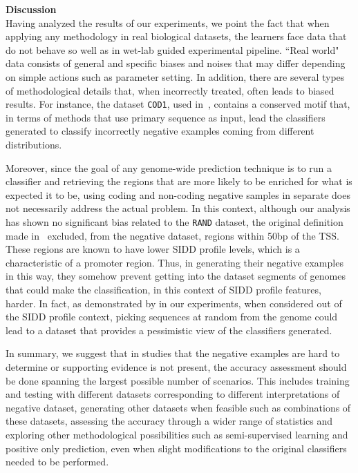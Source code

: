 \documentclass[runningheads,a4paper]{llncs}
\begin{document}
\noindent
{\bf Discussion} \\

Having analyzed the results of our experiments, we point the fact that when applying any methodology in real biological datasets, the learners face data that do not behave so well as in wet-lab guided experimental pipeline. ``Real world" data consists of general and specific biases and noises that may differ depending on simple actions such as parameter setting. In addition, there are several  types of methodological details that, when incorrectly treated, often leads to biased results. For instance, the dataset {\tt COD1}, used in~\cite{gordon2003,song2011}, contains a conserved motif that, in terms of methods that use primary sequence as input,  lead the classifiers generated to classify incorrectly  negative examples coming from different distributions. 

Moreover,  since the goal of any genome-wide prediction technique is to run a classifier  and retrieving the regions that are more likely to be enriched for what is expected it to be, using coding and non-coding negative samples in separate does not necessarily address the actual problem. In this context, although our analysis has shown no significant bias related to the {\tt RAND} dataset, the original definition made in~\cite{bland2010} excluded, from the negative dataset, regions within 50bp of the TSS. These regions are known to have lower SIDD profile levels, which is a characteristic of a promoter region. Thus,  in generating their negative examples in this way, they somehow prevent  getting into the dataset segments of genomes that could make the classification, in this context of SIDD profile features,  harder. In fact, as demonstrated by in our experiments,  when considered out of the SIDD profile context, picking sequences  at random from the genome could lead to a dataset that  provides a pessimistic view of the classifiers generated.

In summary, we suggest that in studies that the negative examples are hard to determine or supporting evidence is not present, the accuracy assessment should be done spanning the largest possible number of scenarios. This includes training and testing with different datasets corresponding to different interpretations of negative dataset, generating other datasets when feasible such as combinations of these datasets, assessing the accuracy through a wider range of statistics and exploring other methodological possibilities such as semi-supervised learning and positive only prediction, even when slight modifications to the original classifiers needed to be performed. 
\end{document}
